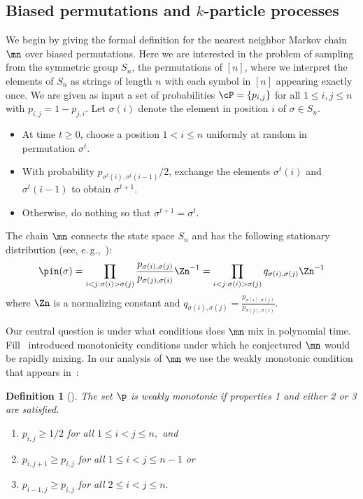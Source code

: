 \documentclass[11pt]{article}
\newtheorem{definition}[theorem]{Definition}
\providecommand{\eg}{e.\,g.}
\begin{document}
\subsection{Biased permutations and $k$-particle processes}\label{sec:MKprelim}

We begin by giving the formal definition for the nearest neighbor 
Markov chain $\mn$ over biased permutations. Here we are interested in 
the problem of sampling from the symmetric group $S_n$, the 
permutations of $[n]$, where we interpret the elements of $S_n$ as strings
of length $n$ with each symbol in $[n]$ appearing exactly once.  
We are given as input a set of probabilities 
$\cP=\{p_{i,j}\}$ for all $1\leq i,j\leq n$ with $p_{i,j}=1-p_{j,i}$.  
Let $\sigma(i)$ denote the element in position $i$ of $\sigma \in S_n$.

\vspace{.1in}

\vspace{.05in}
\begin{itemize}
\item At time $t\geq0$, choose a position $1< i\leq n$ uniformly at random in permutation $\sigma^t$.  
\item With probability $p_{\sigma^t(i), \sigma^t(i-1)}/2$, exchange the elements $\sigma^t(i)$ and $\sigma^t(i-1)$ to obtain $\sigma^{t+1}$.
\item Otherwise, do nothing so that $\sigma^{t+1} = \sigma^{t}.$
\end{itemize}

\noindent The chain $\mn$ connects the state space $S_n$ and has the 
following stationary distribution (see, \eg,~\cite{bmrs}): 
$$\pin(\sigma) = \prod_{i < j: \sigma(i) > 
\sigma(j)}\frac{p_{\sigma(i),\sigma(j)}}{p_{\sigma(j),\sigma(i)}} 
\Zn^{-1} = \prod_{i < j: \sigma(i) > \sigma(j)}q_{\sigma(i), \sigma(j)} 
\Zn^{-1} $$ where $\Zn$ is a normalizing constant  and $q_{\sigma(i), 
\sigma(j)}=\frac{p_{\sigma(i),\sigma(j)}}{p_{\sigma(j),\sigma(i)}}.$  

Our central question is under what conditions does $\mn$ mix in 
polynomial time. %
Fill~\cite{F03}    %
introduced monotonicity 
conditions under which he conjectured $\mn$ would be rapidly mixing. In 
our analysis of $\mn$ we use the weakly monotonic condition that appears
in~\cite{bmrs,MS}: 

\begin{definition}[\cite{bmrs}]The set $\p$ is weakly monotonic if properties 1 and either 2 or 3 are satisfied.
\begin{enumerate}
\item $p_{i,j} \geq 1/2$ for all $1 \leq i < j \leq n,$ and
\item $p_{i,j+1} \geq p_{i,j}$ for all $1 \leq i < j \leq n-1$ or
\item $p_{i-1,j} \geq p_{i,j}$ for all $2 \leq i < j \leq n.$
\end{enumerate}
\end{definition}
\end{document}
